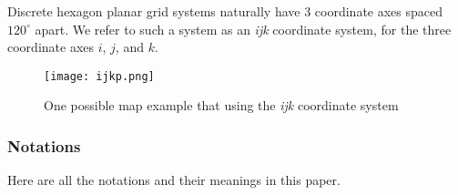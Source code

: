 \documentclass[13pt]{ctexart} %
\begin{document}
Discrete hexagon planar grid systems naturally have $3$ coordinate axes spaced $120^{\circ}$ apart. We refer to such a system as an \textit{ijk} coordinate system, for the three coordinate axes $i$, $j$, and $k$.

\begin {figure}[h]
\centering %
\texttt{[image: ijkp.png]}
\caption{One possible map example that using the \textit{ijk} coordinate system} %
\end {figure}

\subsubsection{Notations}
Here are all the notations and their meanings in this paper.
\end{document}
